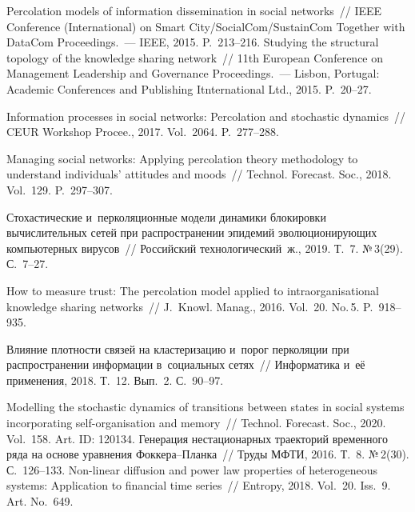 \begin{multicols}{2}
{{\begin{thebibliography}{99}
 Percolation models of information dissemination in social networks~// 
IEEE Conference (International) on Smart City/SocialCom/SustainCom 
Together with DataCom Proceedings.~--- 
IEEE, 2015. P.~213--216.
 Studying the structural topology of the 
knowledge sharing network~// 11th European Conference on Management Leadership and 
Governance Proceedings.~--- Lisbon, Portugal: Academic Conferences and Publishing 
Itnternational Ltd., 2015. P.~20--27.

 Information processes in social networks: 
Percolation and stochastic dynamics~// CEUR Workshop Procee., 2017. Vol.~2064. 
P.~277--288.

 Managing social networks: Applying 
percolation theory methodology to understand individuals' attitudes and moods~// Technol. 
Forecast. Soc., 2018. Vol.~129. P.~297--307.


 Стохастические и~перколяционные 
модели динамики блокировки вычислительных сетей при распространении эпидемий 
эволюционирующих компьютерных вирусов~// Российский технологический~ж., 2019. 
Т.~7. №\,3(29). С.~7--27.

 How to measure trust: The percolation model 
applied to intraorganisational knowledge sharing networks~// J.~Knowl. Manag., 2016. Vol.~20. 
No.\,5. P.~918--935.

 Влияние плотности 
связей на кластеризацию и~порог перколяции при распространении информации 
в~социальных сетях~// Информатика и~её применения, 2018. Т.~12. Вып.~2. С.~90--97.


 Modelling the stochastic dynamics 
of transitions between states in social systems incorporating self-organisation and memory~// 
Technol. Forecast. Soc., 2020. Vol.~158. Art. ID: 120134.
 Генерация нестационарных траекторий временного ряда 
на основе уравнения Фок\-ке\-ра--План\-ка~// Труды МФТИ, 2016. Т.~8. №\,2(30).  
С.~126--133.
 Non-linear diffusion and power law properties of heterogeneous systems: 
Application to financial time series~// Entropy, 2018. Vol.~20. Iss.~9. Art. No.~649.
\end{thebibliography}

}
}

\end{multicols}

